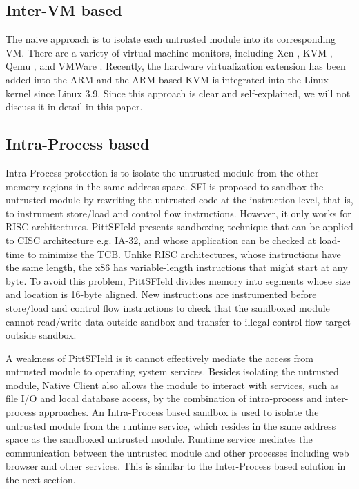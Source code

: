 \subsection{Inter-VM based}
\label{sec:problem2:inter-vm}

The naive approach is to isolate each untrusted module into its corresponding
VM. There are a variety of virtual machine monitors, including Xen \cite{xen},
KVM \cite{kvm}, Qemu \cite{qemu}, and VMWare \cite{vmware}.  Recently, the
hardware virtualization extension has been added into the ARM and the ARM based
KVM \cite{KVM/ARM} is integrated into the Linux kernel since Linux 3.9. Since
this approach is clear and self-explained, we will not discuss it in detail in
this paper.

\subsection{Intra-Process based}
\label{sec:problem2:intra-process}

Intra-Process protection is to isolate the untrusted module from the other
memory regions in the same address space. SFI \cite{SFI} is proposed to sandbox
the untrusted module by rewriting the untrusted code at the instruction level,
that is, to instrument store/load and control flow instructions. However, it
only works for RISC architectures. PittSFIeld \cite{PittSFIeld} presents
sandboxing technique that can be applied to CISC architecture e.g. IA-32, and
whose application can be checked at load-time to minimize the TCB.  Unlike RISC
architectures, whose instructions have the same length, the x86 has
variable-length instructions that might start at any byte. To avoid this
problem, PittSFIeld divides memory into segments whose size and location is
16-byte aligned.  New instructions are instrumented before store/load and
control flow instructions to check that the sandboxed module cannot read/write
data outside sandbox and transfer to illegal control flow target outside
sandbox.

A weakness of PittSFIeld is it cannot effectively mediate the access from
untrusted module to operating system services. Besides isolating the untrusted
module, Native Client \cite{NaCl} also allows the module to interact with
services, such as file I/O and local database access, by the combination of
intra-process and inter-process approaches.  An Intra-Process based sandbox is
used to isolate the untrusted module from the runtime service, which resides in
the same address space as the sandboxed untrusted module. Runtime service
mediates the communication between the untrusted module and other processes
including web browser and other services. This is similar to the Inter-Process
based solution in the next section.

